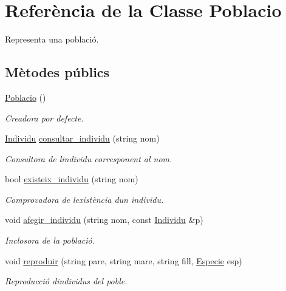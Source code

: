 \hypertarget{class_poblacio}{}\section{Referència de la Classe Poblacio}
\label{class_poblacio}


Representa una població.  


\subsection*{Mètodes públics}
\begin{DoxyCompactItemize}
\item 
\hyperlink{class_poblacio_ac0183157c2cdadc3ef95d11b6614700a}{Poblacio} ()
\begin{DoxyCompactList}\small\item\em Creadora por defecte. \end{DoxyCompactList}\item 
\hyperlink{class_individu}{Individu} \hyperlink{class_poblacio_a0574c7b81e2b8329fb2ffcd0b4365a98}{consultar\+\_\+individu} (string nom)
\begin{DoxyCompactList}\small\item\em Consultora de l\textquotesingle{}individu corresponent al nom. \end{DoxyCompactList}\item 
bool \hyperlink{class_poblacio_ac32cb311f3b283b82adf3d0b7d82fbcc}{existeix\+\_\+individu} (string nom)
\begin{DoxyCompactList}\small\item\em Comprovadora de l\textquotesingle{}existència d\textquotesingle{}un individu. \end{DoxyCompactList}\item 
void \hyperlink{class_poblacio_ae56d498cf63b075d775968f0f880e9f1}{afegir\+\_\+individu} (string nom, const \hyperlink{class_individu}{Individu} \&p)
\begin{DoxyCompactList}\small\item\em Inclosora de la població. \end{DoxyCompactList}\item 
void \hyperlink{class_poblacio_a9e31f2e6394618bc130280322cb24fbf}{reproduir} (string pare, string mare, string fill, \hyperlink{class_especie}{Especie} esp)
\begin{DoxyCompactList}\small\item\em Reproducció d\textquotesingle{}individus del poble. \end{DoxyCompactList}\item 

\end{DoxyCompactItemize}
